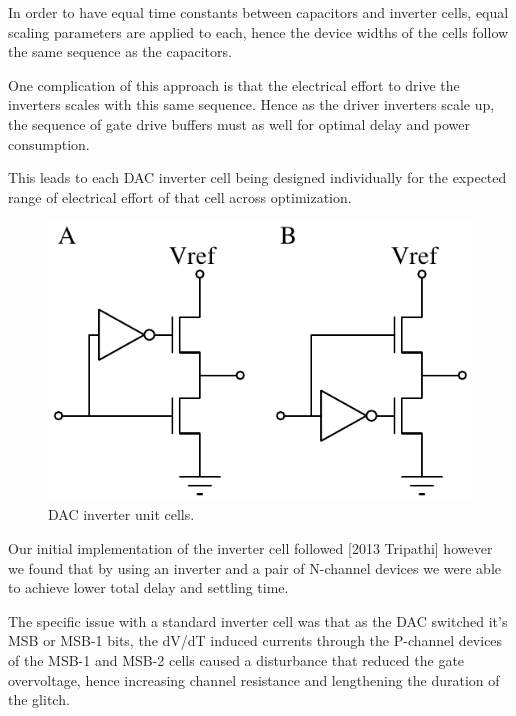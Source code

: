 \documentclass[10pt,journal]{IEEEtran}\usepackage{longtable}
\begin{document}
In order to have equal time constants between capacitors and inverter cells, equal scaling parameters are applied to each, hence the device widths of the cells follow the same sequence as the capacitors.

One complication of this approach is that the electrical effort to drive the inverters scales with this same sequence. 
Hence as the driver inverters scale up, the sequence of gate drive buffers must as well for optimal delay and power consumption.

This leads to each DAC inverter cell being designed individually for the expected range of electrical effort of that cell across optimization.

\begin{figure}[tbph]
\begin{center}
\includegraphics[width=1\columnwidth]{DAC_Switch.pdf}
\caption{DAC inverter unit cells.}
\label{fig:DACUnitInverterSch}
\end{center}
\end{figure}


Our initial implementation of the inverter cell followed [2013 Tripathi] however we found that by using an inverter and a pair of N-channel devices we were able to achieve lower total delay and settling time. 

The specific issue with a standard inverter cell was that as the DAC switched it's MSB or MSB-1 bits, the dV/dT induced currents through the P-channel devices of the MSB-1 and MSB-2 cells caused a disturbance that reduced the gate overvoltage, hence increasing channel resistance and lengthening the duration of the glitch. 
\end{document}
